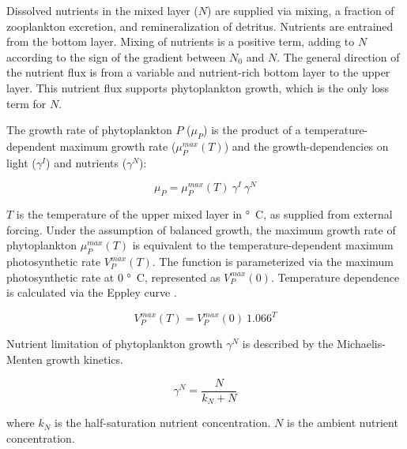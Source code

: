 \documentclass[journal abbreviation, manuscript]{copernicus}
\begin{document}
Dissolved nutrients in the mixed layer ($N$) are supplied via mixing, a fraction of zooplankton excretion, and remineralization of detritus. Nutrients are entrained from the bottom layer. Mixing of nutrients is a positive term, adding to $N$ according to the sign of the gradient between $N_0$ and $N$. The general direction of the nutrient flux is from a variable and nutrient-rich bottom layer to the upper layer. This nutrient flux supports phytoplankton growth, which is the only loss term for $N$.

The growth rate of phytoplankton $P$ ($\mu_{P}$) is the product of a temperature-dependent maximum growth rate ($\mu_P^{max}(T)$) and the growth-dependencies on light ($\gamma^{I}$) and nutrients ($\gamma^{N}$): 

\begin{equation}
    \mu_{P} = \mu_P^{max}(T) \ \gamma^{I} \ \gamma^{N}
\end{equation}

$T$ is the temperature of the upper mixed layer in \unit{\degree C}, as supplied from external forcing. Under the assumption of balanced growth, the maximum growth rate of phytoplankton $\mu_P^{max}(T)$ is equivalent to the temperature-dependent maximum photosynthetic rate $V_P^{max}(T)$. The function is parameterized via the maximum photosynthetic rate at 0 \unit{\degree C}, represented as $V_P^{max}(0)$. Temperature dependence is calculated via the Eppley curve \citep{Eppley1972TemperatureSea}.

\begin{equation}
    V_P^{max}(T) = V_P^{max}(0) \ 1.066^T
\end{equation}

Nutrient limitation of phytoplankton growth $\gamma^N$ is described by the Michaelis-Menten growth kinetics.

\begin{equation}
    \gamma^N = \frac{N}{k_N + N}
\end{equation}

where $k_N$ is the half-saturation nutrient concentration. $N$ is the ambient nutrient concentration.
\end{document}
